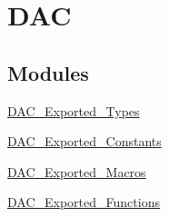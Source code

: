 \hypertarget{group__DAC}{
\section{DAC}
\label{group__DAC}
}
\subsection*{Modules}
\begin{DoxyCompactItemize}
\item 
\hyperlink{group__DAC__Exported__Types}{DAC\_\-Exported\_\-Types}
\item 
\hyperlink{group__DAC__Exported__Constants}{DAC\_\-Exported\_\-Constants}
\item 
\hyperlink{group__DAC__Exported__Macros}{DAC\_\-Exported\_\-Macros}
\item 
\hyperlink{group__DAC__Exported__Functions}{DAC\_\-Exported\_\-Functions}
\end{DoxyCompactItemize}
